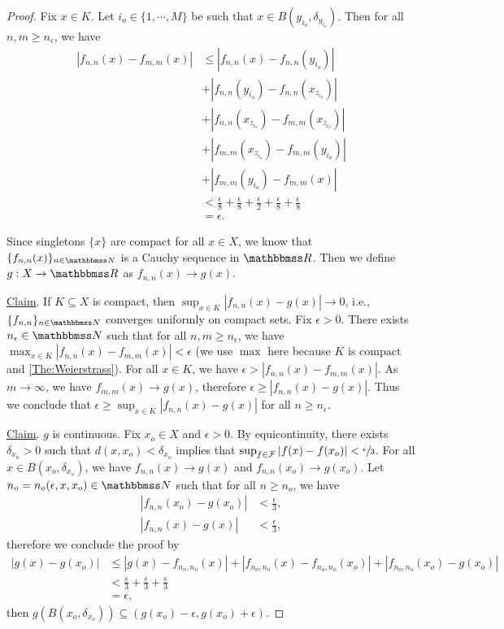 \documentclass[screen,single]{techreport}
\numberwithin{equation}{section}
\begin{document}
\begin{proof}
  Fix $x \in K$. Let $i_o \in \{1,\cdots,M\}$ be such that $x \in B(y_{i_o},\delta_{y_{i_o}})$.
  Then for all $n,m \ge n_\epsilon$, we have
  \begin{align*}
    |f_{n,n}(x) - f_{m,m}(x)| & \le |f_{n,n}(x) - f_{n,n}(y_{i_o})| \\
    & + |f_{n,n}(y_{i_o}) - f_{n,n}(x_{z_{i_o}})| \\
    & +  |f_{n,n}(x_{z_{i_o}}) -  f_{m,m}(x_{z_{i_o}})| \\
    & + |f_{m,m}(x_{z_{i_o}}) - f_{m,m}(y_{i_o})| \\
    & + |f_{m,m}(y_{i_o}) - f_{m,m}(x)| \\
    & < \frac{\epsilon}{8} + \frac{\epsilon}{8} + \frac{\epsilon}{2} + \frac{\epsilon}{8} + \frac{\epsilon}{8} \\
    & = \epsilon.
  \end{align*}
  
  Since singletons $\{x\}$ are compact for all $x \in X$, we know that $\{f_{n,n}(x)\}_{n \in \bbN}$ is a Cauchy sequence in $\bbR$.
  Then we define $g : X \to \bbR$ as $f_{n,n}(x) \rightarrow g(x)$.
  
  \underline{Claim}. If $K \subseteq X$ is compact, then $\sup_{x \in K} |f_{n,n}(x) - g(x)| \rightarrow 0$, i.e., $\{f_{n,n}\}_{n \in \bbN}$ converges uniformly on compact sets.
  Fix $\epsilon > 0$.
  There exists $n_\epsilon \in \bbN$ such that for all $n,m \ge n_\epsilon$, we have $\max_{x \in K} |f_{n,n}(x) - f_{m,m}(x)| < \epsilon$ (we use $\max$ here because $K$ is compact and \cref{The:Weierstrass}).
  For all $x \in K$, we have $\epsilon > |f_{n,n}(x) - f_{m,m}(x)|$.
  As $m \to \infty$, we have $f_{m,m}(x) \rightarrow g(x)$, therefore $\epsilon \ge |f_{n,n}(x) - g(x)|$.
  Thus we conclude that $\epsilon \ge \sup_{x \in K} |f_{n,n}(x) - g(x)|$ for all $n \ge n_\epsilon$.
  
  \underline{Claim}. $g$ is continuous.
  Fix $x_o \in X$ and $\epsilon > 0$.
  By equicontinuity, there exists $\delta_{x_o} > 0$ such that $d(x,x_o) < \delta_{x_o}$ implies that $\sup_{f \in \mathcal{F}} |f(x)-f(x_o)| < \sfrac{\epsilon}{3}$.
  For all $x \in B(x_o,\delta_{x_o})$, we have $f_{n,n}(x) \rightarrow g(x)$ and $f_{n,n}(x_o) \rightarrow g(x_o)$.
  Let $n_o = n_o(\epsilon,x,x_o) \in \bbN$ such that for all $n \ge n_o$, we have
  \begin{align*}
  |f_{n,n}(x_o) - g(x_o)| & <  \frac{\epsilon}{3}, \\
  |f_{n,n}(x) - g(x)| & < \frac{\epsilon}{3},
  \end{align*}
  therefore we conclude the proof by
  \begin{align*}
    |g(x) - g(x_o)| & \le |g(x) - f_{n_o,n_o}(x)| + |f_{n_o,n_o}(x) - f_{n_o,n_o}(x_o)| + |f_{n_o,n_o}(x_o) - g(x_o)| \\
    & < \frac{\epsilon}{3} + \frac{\epsilon}{3} + \frac{\epsilon}{3} \\
    & = \epsilon,
  \end{align*}
  then $g(B(x_o,\delta_{x_o})) \subseteq (g(x_o) - \epsilon,g(x_o)+\epsilon)$.
\end{proof}
\end{document}
